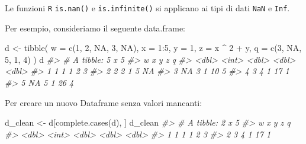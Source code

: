 \documentclass[
  11pt,
]{krantz}
\makeatletter
\newenvironment{Shaded}{\begin{snugshade}}{\end{snugshade}}
\newcommand{\AttributeTok}[1]{\textcolor[rgb]{0.61,0.61,0.61}{#1}}
\newcommand{\CommentTok}[1]{\textcolor[rgb]{0.37,0.37,0.37}{\textit{#1}}}
\newcommand{\ConstantTok}[1]{\textcolor[rgb]{0,0,0}{#1}}
\newcommand{\DecValTok}[1]{\textcolor[rgb]{0.06,0.06,0.06}{#1}}
\newcommand{\FunctionTok}[1]{\textcolor[rgb]{0,0,0}{#1}}
\newcommand{\NormalTok}[1]{#1}
\newcommand{\OtherTok}[1]{\textcolor[rgb]{0.37,0.37,0.37}{#1}}
\newcommand{\SpecialCharTok}[1]{\textcolor[rgb]{0,0,0}{#1}}
\newenvironment{kframe}{%
\medskip{}
\setlength{\fboxsep}{.8em}
 \def\at@end@of@kframe{}%
 \ifinner\ifhmode%
  \def\at@end@of@kframe{\end{minipage}}%
  \begin{minipage}{\columnwidth}%
 \fi\fi%
 \def\FrameCommand##1{\hskip\@totalleftmargin \hskip-\fboxsep
 \colorbox{shadecolor}{##1}\hskip-\fboxsep
     \hskip-\linewidth \hskip-\@totalleftmargin \hskip\columnwidth}%
 \MakeFramed {\advance\hsize-\width
   \@totalleftmargin\z@ \linewidth\hsize
   \@setminipage}}%
 {\par\unskip\endMakeFramed%
 \at@end@of@kframe}
\renewenvironment{Shaded}{\begin{kframe}}{\end{kframe}}
\theoremstyle{definition}
\theoremstyle{definition}
\theoremstyle{definition}
\theoremstyle{definition}
\theoremstyle{remark}
\makeatother
\begin{document}
Le funzioni \texttt{R} \texttt{is.nan()} e \texttt{is.infinite()} si applicano ai tipi di dati \texttt{NaN} e \texttt{Inf}.

Per esempio, consideriamo il seguente data.frame:

\begin{Shaded}
\begin{Highlighting}[]
\NormalTok{d }\OtherTok{\textless{}{-}} \FunctionTok{tibble}\NormalTok{(}
  \AttributeTok{w =} \FunctionTok{c}\NormalTok{(}\DecValTok{1}\NormalTok{, }\DecValTok{2}\NormalTok{, }\ConstantTok{NA}\NormalTok{, }\DecValTok{3}\NormalTok{, }\ConstantTok{NA}\NormalTok{), }
  \AttributeTok{x =} \DecValTok{1}\SpecialCharTok{:}\DecValTok{5}\NormalTok{, }
  \AttributeTok{y =} \DecValTok{1}\NormalTok{, }
  \AttributeTok{z =}\NormalTok{ x }\SpecialCharTok{\^{}} \DecValTok{2} \SpecialCharTok{+}\NormalTok{ y,}
  \AttributeTok{q =} \FunctionTok{c}\NormalTok{(}\DecValTok{3}\NormalTok{, }\ConstantTok{NA}\NormalTok{, }\DecValTok{5}\NormalTok{, }\DecValTok{1}\NormalTok{, }\DecValTok{4}\NormalTok{)}
\NormalTok{)}
\NormalTok{d}
\CommentTok{\#\textgreater{} \# A tibble: 5 x 5}
\CommentTok{\#\textgreater{}       w     x     y     z     q}
\CommentTok{\#\textgreater{}   \textless{}dbl\textgreater{} \textless{}int\textgreater{} \textless{}dbl\textgreater{} \textless{}dbl\textgreater{} \textless{}dbl\textgreater{}}
\CommentTok{\#\textgreater{} 1     1     1     1     2     3}
\CommentTok{\#\textgreater{} 2     2     2     1     5    NA}
\CommentTok{\#\textgreater{} 3    NA     3     1    10     5}
\CommentTok{\#\textgreater{} 4     3     4     1    17     1}
\CommentTok{\#\textgreater{} 5    NA     5     1    26     4}
\end{Highlighting}
\end{Shaded}

\begin{Shaded}
\end{Shaded}

Per creare un nuovo Dataframe senza valori mancanti:

\begin{Shaded}
\begin{Highlighting}[]
\NormalTok{d\_clean }\OtherTok{\textless{}{-}}\NormalTok{ d[}\FunctionTok{complete.cases}\NormalTok{(d), ]}
\NormalTok{d\_clean}
\CommentTok{\#\textgreater{} \# A tibble: 2 x 5}
\CommentTok{\#\textgreater{}       w     x     y     z     q}
\CommentTok{\#\textgreater{}   \textless{}dbl\textgreater{} \textless{}int\textgreater{} \textless{}dbl\textgreater{} \textless{}dbl\textgreater{} \textless{}dbl\textgreater{}}
\CommentTok{\#\textgreater{} 1     1     1     1     2     3}
\CommentTok{\#\textgreater{} 2     3     4     1    17     1}
\end{Highlighting}
\end{Shaded}
\end{document}
